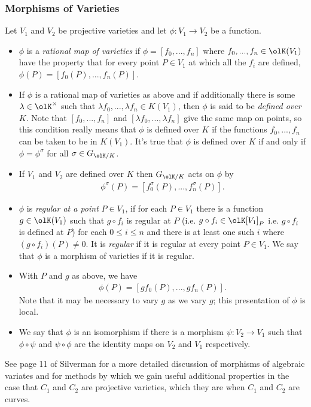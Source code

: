 	\subsubsection{Morphisms of Varieties}
	Let $V_1$ and $V_2$ be projective varieties and let $\phi:V_1\to V_2$ be a function.
	\begin{itemize}
		\item $\phi$ is a \emph{rational map of varieties} if $\phi = [f_0,...,f_n]$ where $f_0,...,f_n \in \olK(V_1)$ have the property that for every point $P \in V_1$ at which all the $f_i$ are defined, $\phi(P) = [f_0(P),...,f_n(P)]$.
		\item If $\phi$ is a rational map of varieties as above and if additionally there is some $\lambda \in \olK^\times$ such that $\lambda f_0,...,\lambda f_n \in K(V_1)$, then $\phi$ is said to be \emph{defined over $K$}. Note that $[f_0,...,f_n]$ and $[\lambda f_0,...,\lambda f_n]$ give the same map on points, so this condition really means that $\phi$ is defined over $K$ if the functions $f_0,...,f_n$ can be taken to be in $K(V_1)$. It's true that $\phi$ is defined over $K$ if and only if $\phi = \phi^\sigma$ for all $\sigma \in G_{\olK/K}$.
		\item If $V_1$ and $V_2$ are defined over $K$ then $G_{\olK/K}$ acts on $\phi$ by
			\begin{align*}
				\phi^\sigma(P) = [f_0^\sigma(P),...,f_n^\sigma(P)].
			\end{align*}
		\item $\phi$ is \emph{regular at a point} $P \in V_1$, if for each $P \in V_1$ there is a function $g \in \olK(V_1)$ such that $g\circ f_i$ is regular at $P$ (i.e. $g\circ f_i \in \olK[V_1]_P$ i.e. $g\circ f_i$ is defined at $P$) for each $0\leq i \leq n$ and there is at least one such $i$ where $(g\circ f_i)(P) \neq 0$. It is \emph{regular} if it is regular at every point $P \in V_1$. We say that $\phi$ is a morphism of varieties if it is regular.
		\item With $P$ and $g$ as above, we have
			\begin{align*}
				\phi(P) = [gf_0(P),...,gf_n(P)].
			\end{align*}
			Note that it may be necessary to vary $g$ as we vary $g$; this presentation of $\phi$ is local.
		\item We say that $\phi$ is an isomorphism if there is a morphism $\psi:V_2\to V_1$ such that $\phi\circ \psi$ and $\psi\circ \phi$ are the identity maps on $V_2$ and $V_1$ respectively.
	\end{itemize}
	See page 11 of Silverman for a more detailed discussion of morphisms of algebraic variates and for methods by which we gain useful additional properties in the case that $C_1$ and $C_2$ are projective varieties, which they are when $C_1$ and $C_2$ are curves.
	
